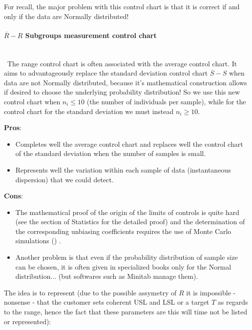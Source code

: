 	For recall, the major problem with this control chart is that it is correct if and only if the data are Normally distributed!
	
	\paragraph{$\overline{R}-R$ Subgroups measurement control chart}\mbox{}\\\
	The range control chart is often associated with the average control chart. It aims to advantageously replace the standard deviation control chart $\overline {S}-S$ when data are not Normally distributed, because it's mathematical construction allows if desired to choose the underlying probability distribution! So we use this new control chart when $n_i\leq 10$ (the number of individuals per sample), while for the control chart for the standard deviation we must instead $n_i\geq 10$.
	
	\textbf{Pros}:
	\begin{itemize}
		\item Completes well the average control chart and replaces well the control chart of the standard deviation when the number of samples is small. 

		\item Represents well the variation within each sample of data (instantaneous dispersion) that we could detect.
	\end{itemize}

	\textbf{Cons}:
	\begin{itemize}
		\item The mathematical proof of the origin of the limits of controls is quite hard (see the section of Statistics for the detailed proof) and the determination of the corresponding unbiasing coefficients requires the use of Monte Carlo simulations () . 

		\item Another problem is that even if the probability distribution of sample size can be chosen, it is often given in specialized books only for the Normal distribution... (but softwares such as Minitab manage them).
 	\end{itemize}
 	The idea is to represent (due to the possible assymetry of $R$ it is impossible - nonsense - that the customer sets coherent USL and LSL or a target $T$ as regards to the range, hence the fact that these parameters are this will time not be listed or represented):
 	
